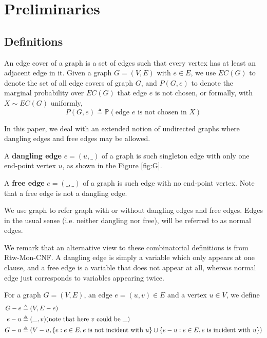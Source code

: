 
\section{Preliminaries}
\subsection{Definitions}
An edge cover of a graph is a set of edges such that every vertex has at least an adjacent edge in it.
Given a graph $G=(V,E)$ with $e \in E$,  we use $EC(G)$ to denote the set of all edge covers of graph $G$, and $P(G, e)$ to denote the marginal probability over $EC(G)$ that edge $e$ is not chosen, or formally, with $X \sim EC(G)$ uniformly,
\begin{equation}
	P(G, e) \triangleq \mathbb{P} \left(\textrm{edge $e$ is not chosen in $X$} \right)
	\label{defpge}
\end{equation}

In this paper, we deal with an extended notion of undirected graphs where dangling edges and free edges may be allowed.
\begin{Def}
	A {\bf dangling edge} $e=(u,\_)$ of a graph is such singleton edge with only one end-point vertex $u$, as shown in the Figure \ref{fig:G}.

	A {\bf free edge} $e=(\_, \_)$ of a graph is such edge with no end-point vertex. Note that a free edge is not a dangling edge.


\end{Def}

	We use graph to refer graph with or without dangling edges and free edges.
	Edges in the usual sense (i.e. neither dangling nor free), will be referred to as normal edges.

	We remark that an alternative view to these combinatorial definitions is from Rtw-Mon-CNF.
	A dangling edge is simply a variable which only appears at one clause, and a free edge is a variable
	that does not appear at all, whereas normal edge just corresponds to variables appearing twice.

For a graph $G=(V,E)$, an edge $e = (u,v) \in E$ and a vertex $u \in V$,
we define
\begin{align*}
G - e &\triangleq (V, E-e) \\
e - u &\triangleq (\_, v) \text{(note that here $v$ could be $\_$)} \\
G - u &\triangleq (V - u, \left\{e: e \in E, e\text{ is not incident with }u\right\} \cup \left\{e - u: e \in E, e\text{ is incident with }u\right\})
\end{align*}

